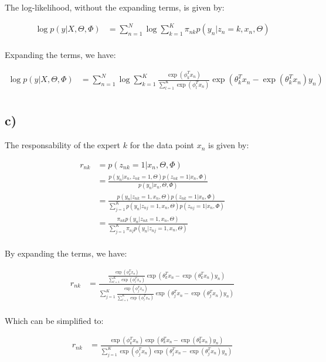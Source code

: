\documentclass[12pt,a4paper,oneside]{paper}
\begin{document}
The log-likelihood, without the expanding terms, is given by:

\begin{align*}
    \log p(y | X, \Theta, \Phi) &= \sum_{n=1}^{N} \log \sum_{k=1}^{K} \pi_{nk} p(y_n | z_n = k, x_n, \Theta) \\
\end{align*}

Expanding the terms, we have:

\begin{align*}
    \log p(y | X, \Theta, \Phi) &= \sum_{n=1}^{N} \log \sum_{k=1}^{K} \frac{\exp(\phi_k^T x_n)}{\sum_{l=1}^{K} \exp(\phi_l^T x_n)} \exp(\theta_k^T x_n -\exp(\theta_k^T x_n) y_n) \\
\end{align*}

\subsection*{c)}

The responsability of the expert $k$ for the data point $x_n$ is given by:

\begin{align*}
    r_{nk} &= p(z_{nk} = 1 | x_n, \Theta, \Phi) \\
    &= \frac{p(y_n | x_n, z_{nk} = 1, \Theta) p(z_{nk} = 1 | x_n, \Phi)}{p(y_n | x_n, \Theta, \Phi)} \\
    &= \frac{p(y_n | z_{nk} = 1, x_n, \Theta) p(z_{nk} = 1 | x_n, \Phi)}{\sum_{j=1}^{K} p(y_n | z_{nj} = 1, x_n, \Theta) p(z_{nj} = 1 | x_n, \Phi)} \\
    &= \frac{\pi_{nk} p(y_n | z_{nk} = 1, x_n, \Theta)}{\sum_{j=1}^{K} \pi_{nj} p(y_n | z_{nj} = 1, x_n, \Theta)} \\
\end{align*}

By expanding the terms, we have:

\begin{align*}
    r_{nk} &= \frac{\frac{\exp(\phi_k^T x_n)}{\sum_{l=1}^{K} \exp(\phi_l^T x_n)} \exp(\theta_k^T x_n -\exp(\theta_k^T x_n) y_n)}{\sum_{j=1}^{K} \frac{\exp(\phi_j^T x_n)}{\sum_{l=1}^{K} \exp(\phi_l^T x_n)} \exp(\theta_j^T x_n -\exp(\theta_j^T x_n) y_n)} \\
\end{align*}

Which can be simplified to:

\begin{align*}
    r_{nk} &= \frac{\exp(\phi_k^T x_n) \exp(\theta_k^T x_n -\exp(\theta_k^T x_n) y_n)}{\sum_{j=1}^{K} \exp(\phi_j^T x_n) \exp(\theta_j^T x_n -\exp(\theta_j^T x_n) y_n)} \\
\end{align*}
\end{document}
